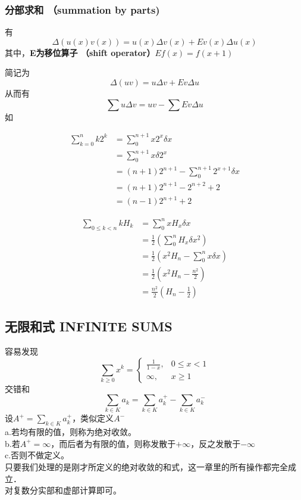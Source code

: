 \subsubsection{分部求和 （summation by parts)}

有
$$
\Delta(u(x)v(x))=u(x)\Delta v(x)+Ev(x)\Delta u(x)
$$
其中，\textbf{E为移位算子 （shift operator）}$Ef(x)=f(x+1)$

简记为
$$
\Delta(uv)=u\Delta v+Ev \Delta u
$$
从而有
$$
\sum u\Delta v=uv-\sum Ev\Delta u
$$
如
\begin{example}
  $$
\begin{aligned}
\sum_{k=0}^{n}k 2^k&=\sum_{0}^{n+1}x2^x\delta x\\
&=\sum_{0}^{n+1}x\delta 2^x\\
&=(n+1)2^{n+1}-\sum_{0}^{n+1}2^{x+1}\delta x\\
&=(n+1)2^{n+1}-2^{n+2}+2\\
&=(n-1)2^{n+1}+2
\end{aligned}
$$
\end{example}

\begin{example}
  $$
\begin{aligned}
\sum_{0\le k< n} k H_k&=\sum_{0}^{n} xH_x \delta x\\
&=\frac{1}{2}\left( \sum_0^n H_x\delta x^{\underline{2}}  \right)\\
&=\frac{1}{2}\left( x^{\underline{2}} H_n- \sum_0^n x \delta x  \right)\\
&=\frac{1}{2}\left( x^{\underline{2}} H_n- \frac{n^{\underline{2}}}{2}  \right)\\
&=\frac{n^{\underline{2}}}{2} \left(H_n-\frac{1}{2} \right)
\end{aligned}
$$
\end{example}

\subsection{无限和式 INFINITE SUMS}

容易发现
$$
\sum_{k\ge0} x^k=
\begin{cases}
\frac{1}{1-x},& 0\le x<1\\
\infty ,& x\ge1
\end{cases}
$$
交错和
$$
\sum_{k\in K}a_k =\sum_{k\in K}a_k^{+}-\sum_{k\in K} a_k^{-}
$$
设$A^{+}=\sum_{k\in K}a_k^{+} $，类似定义$A^{-}$\\

a.若均有限的值，则称为绝对收敛。\\
b.若$A^{+}=\infty$，而后者为有限的值，则称发散于$+\infty$，反之发散于$-\infty$\\
c.否则不做定义。\\

只要我们处理的是刚才所定义的绝对收敛的和式，这一章里的所有操作都完全成立．\\

对复数分实部和虚部计算即可。\\